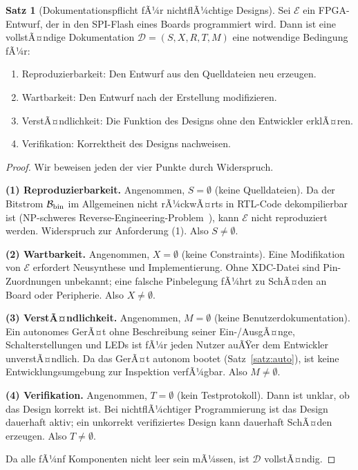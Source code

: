 ﻿\documentclass[a4paper,12pt]{article}
\theoremstyle{definition}
\newtheorem{satz}{Satz}
\begin{document}
\begin{satz}[Dokumentationspflicht fÃ¼r nichtflÃ¼chtige Designs]
    \label{satz:pflicht}
    Sei $\mathcal{E}$ ein FPGA-Entwurf, der in den SPI-Flash eines Boards
    programmiert wird. Dann ist eine vollstÃ¤ndige Dokumentation
    $\mathcal{D} = (S, X, R, T, M)$ eine notwendige Bedingung fÃ¼r:
    \begin{enumerate}
        \item Reproduzierbarkeit: Den Entwurf aus den Quelldateien neu erzeugen.
        \item Wartbarkeit: Den Entwurf nach der Erstellung modifizieren.
        \item VerstÃ¤ndlichkeit: Die Funktion des Designs ohne den Entwickler erklÃ¤ren.
        \item Verifikation: Korrektheit des Designs nachweisen.
    \end{enumerate}
\end{satz}

\begin{proof}
    Wir beweisen jeden der vier Punkte durch Widerspruch.

    \textbf{(1) Reproduzierbarkeit.}
    Angenommen, $S = \emptyset$ (keine Quelldateien). Da der Bitstrom
    $\mathcal{B}_{\rm bin}$ im Allgemeinen nicht rÃ¼ckwÃ¤rts in RTL-Code
    dekompilierbar ist (NP-schweres Reverse-Engineering-Problem~\cite{quadrant2020}),
    kann $\mathcal{E}$ nicht reproduziert werden. Widerspruch zur Anforderung (1).
    Also $S \neq \emptyset$.

    \textbf{(2) Wartbarkeit.}
    Angenommen, $X = \emptyset$ (keine Constraints). Eine Modifikation von
    $\mathcal{E}$ erfordert Neusynthese und Implementierung. Ohne XDC-Datei
    sind Pin-Zuordnungen unbekannt; eine falsche Pinbelegung fÃ¼hrt zu
    SchÃ¤den an Board oder Peripherie. Also $X \neq \emptyset$.

    \textbf{(3) VerstÃ¤ndlichkeit.}
    Angenommen, $M = \emptyset$ (keine Benutzerdokumentation). Ein autonomes
    GerÃ¤t ohne Beschreibung seiner Ein-/AusgÃ¤nge, Schalterstellungen und
    LEDs ist fÃ¼r jeden Nutzer auÃŸer dem Entwickler unverstÃ¤ndlich.
    Da das GerÃ¤t autonom bootet (Satz~\ref{satz:auto}), ist keine
    Entwicklungsumgebung zur Inspektion verfÃ¼gbar. Also $M \neq \emptyset$.

    \textbf{(4) Verifikation.}
    Angenommen, $T = \emptyset$ (kein Testprotokoll). Dann ist unklar, ob
    das Design korrekt ist. Bei nichtflÃ¼chtiger Programmierung ist das
    Design dauerhaft aktiv; ein unkorrekt verifiziertes Design kann
    dauerhaft SchÃ¤den erzeugen. Also $T \neq \emptyset$.

    Da alle fÃ¼nf Komponenten nicht leer sein mÃ¼ssen, ist $\mathcal{D}$ vollstÃ¤ndig.
    \qedhere
\end{proof}
\end{document}
